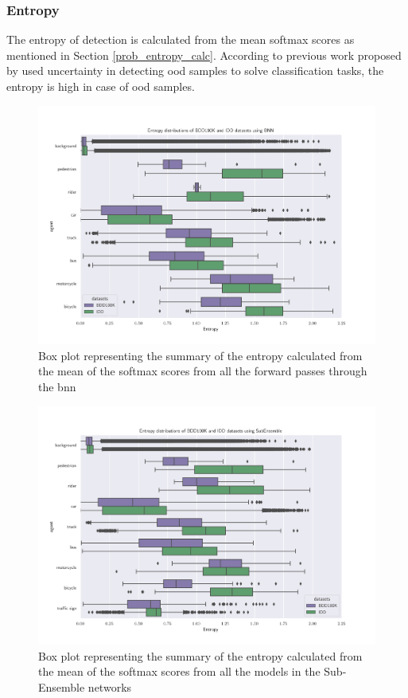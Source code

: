     \subsubsection{Entropy}
    The entropy of detection is calculated from the mean softmax scores as mentioned in Section \ref{prob_entropy_calc}. According to previous work proposed by \citet{Ovadia2019} used uncertainty in detecting \acrshort{ood} samples to solve classification tasks, the entropy is high in case of \acrshort{ood} samples.
    
    \begin{figure}[ht]
        \centering
        \includegraphics[scale=0.55]{images/distributions/BNN_bdd_vs_iid_entropy.png}
        \caption[Box plot of entropies with Bayesian model]{Box plot representing the summary of the entropy calculated from the mean of the softmax scores from all the forward passes through the \acrshort{bnn}}
        \label{fig:bnn_ent_summary}
    \end{figure}
    
    \begin{figure}[ht]
        \centering
        \includegraphics[scale=0.55]{images/distributions/SubEns_bdd_vs_iid_entropy.png}
        \caption[Box plot of entropies with Sub-Ensemble model]{Box plot representing the summary of the entropy calculated from the mean of the softmax scores from all the models in the Sub-Ensemble networks}
        \label{fig:subens_ent_summary}
    \end{figure}
    
